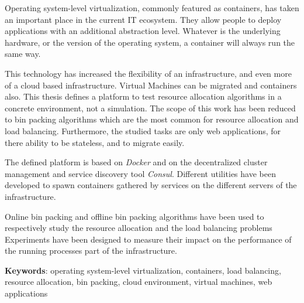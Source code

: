 Operating system-level virtualization, commonly featured as containers, has taken an
important place in the current IT ecosystem. They allow people to deploy
applications with an additional abstraction level. Whatever is the underlying
hardware, or the version of the operating system, a container will always run
the same way.

This technology has increased the flexibility of an infrastructure, and even
more of a cloud based infrastructure. Virtual Machines can be migrated and
containers also. This thesis defines a platform to test resource allocation
algorithms in a concrete environment, not a simulation. The scope of this work
has been reduced to bin packing algorithms which are the most common for
resource allocation and load balancing. Furthermore, the studied tasks are only
web applications, for there ability to be stateless, and to migrate easily.

The defined platform is based on \textit{Docker} and on the decentralized
cluster management and service discovery tool \textit{Consul}. Different
utilities have been developed to spawn containers gathered by services on the
different servers of the infrastructure.

Online bin packing and offline bin packing algorithms have been used to
respectively study the resource allocation and the load balancing problems
Experiments have been designed to measure their impact on the performance
of the running processes part of the infrastructure.

\vspace{2em}
\textbf{Keywords}: operating system-level virtualization, containers, load
balancing, resource allocation, bin packing, cloud environment, virtual
machines, web applications
